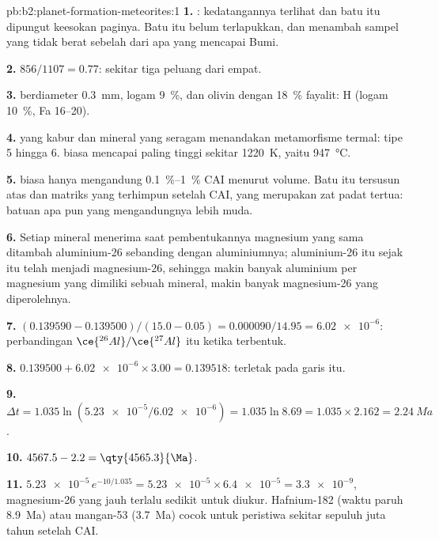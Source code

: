 \begin{solution}{pb:b2:planet-formation-meteorites:1}
\textbf{1.} : kedatangannya terlihat dan batu itu dipungut keesokan paginya.
Batu itu belum terlapukkan, dan menambah sampel yang tidak berat sebelah dari apa yang mencapai Bumi.

\textbf{2.} $856/1107 = 0.77$: sekitar tiga peluang dari empat.

\textbf{3.}  berdiameter \qty{0.3}{mm}, logam \qty{9}{\percent}, dan olivin dengan
\qty{18}{\percent} fayalit:  H (logam \qty{10}{\percent}, Fa 16--20).

\textbf{4.}  yang kabur dan mineral yang seragam menandakan metamorfisme termal: tipe
5 hingga 6.  biasa mencapai paling tinggi sekitar \qty{1220}{K}, yaitu
\qty{947}{\degreeCelsius}.

\textbf{5.}  biasa hanya mengandung \qtyrange{0.1}{1}{\percent} CAI menurut
volume. Batu itu tersusun atas  dan matriks yang terhimpun setelah CAI, yang
merupakan zat padat tertua: batuan apa pun yang mengandungnya lebih muda.

\textbf{6.} Setiap mineral menerima saat pembentukannya magnesium yang sama ditambah aluminium-26
sebanding dengan aluminiumnya; aluminium-26 itu sejak itu telah menjadi
magnesium-26, sehingga makin banyak aluminium per magnesium yang dimiliki sebuah mineral, makin banyak
magnesium-26 yang diperolehnya.

\textbf{7.} $(0.139590 - 0.139500)/(15.0 - 0.05) = \num{0.000090}/14.95 =
\num{6.02e-6}$: perbandingan $\ce{^{26}Al}/\ce{^{27}Al}$  itu ketika
terbentuk.

\textbf{8.} $0.139500 + \num{6.02e-6}\times3.00 = 0.139518$: terletak pada garis itu.

\textbf{9.} $\Delta t = 1.035\ln(\num{5.23e-5}/\num{6.02e-6}) = 1.035\ln8.69 =
1.035\times2.162 = \qty{2.24}{Ma}$.

\textbf{10.} $4567.5 - 2.2 = \qty{4565.3}{\Ma}$.

\textbf{11.} $\num{5.23e-5}\,e^{-10/1.035} = \num{5.23e-5}\times\num{6.4e-5} =
\num{3.3e-9}$, magnesium-26 yang jauh terlalu sedikit untuk diukur. Hafnium-182 (waktu paruh
\qty{8.9}{Ma}) atau mangan-53 (\qty{3.7}{Ma}) cocok untuk peristiwa sekitar sepuluh juta tahun
setelah CAI.


\end{solution}
